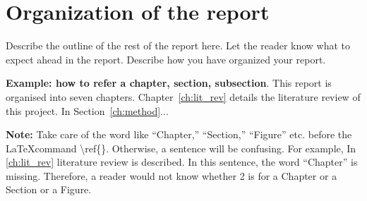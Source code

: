 \section{Organization of the report} %
\label{sec:intro_org} %
Describe the outline of the rest of the report here. Let the reader know what to expect ahead in the report. Describe how you have organized your report. 

\textbf{Example: how to refer a chapter, section, subsection}. This report is organised into seven chapters. Chapter~\ref{ch:lit_rev} details the literature review of this project. In Section~\ref{ch:method}...  %

\textbf{Note:}  Take care of the word like ``Chapter,'' ``Section,'' ``Figure'' etc. before the \LaTeX command \textbackslash ref\{\}. Otherwise, a  sentence will be confusing. For example, In \ref{ch:lit_rev} literature review is described. In this sentence, the word ``Chapter'' is missing. Therefore, a reader would not know whether 2 is for a Chapter or a Section or a Figure.


